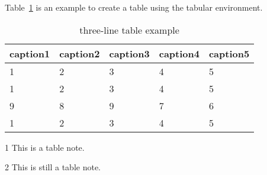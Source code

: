 \documentclass{article}
\begin{document}
Table~\ref{tab:tabular1} is an example to create a table using the tabular environment.

\begin{table}[htbp]
    \caption{three-line table example}
    \label{tab:tabular1}
    \centering
    \begin{threeparttable}
        \begin{tabular}{lllll}
            \toprule
            caption1\tnote{1} & caption2 & caption3\tnote{2} & caption4 & caption5 \\
            \midrule
            1                 & 2        & 3                 & 4        & 5        \\
            1                 & 2        & 3                 & 4        & 5        \\
            9                 & 8        & 9                 & 7        & 6        \\
            1                 & 2        & 3                 & 4        & 5        \\
            \bottomrule
        \end{tabular}
        \begin{tablenotes}
            \footnotesize
            \item[1] This is a table note.
            \item[2] This is still a table note.
        \end{tablenotes}

    \end{threeparttable}
\end{table}
\end{document}
